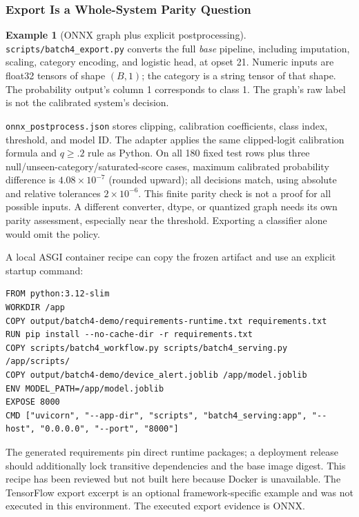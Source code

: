\documentclass[11pt,twoside]{article}
\numberwithin{equation}{section}
\theoremstyle{plain}
\theoremstyle{definition}
\newtheorem{example}[theorem]{Example}
\theoremstyle{remark}
\begin{document}
\subsubsection{Export Is a Whole-System Parity Question}
\begin{example}[ONNX graph plus explicit postprocessing]
\texttt{scripts/batch4\_export.py} converts the full \emph{base} pipeline,
including imputation, scaling, category encoding, and logistic head, at opset 21.
Numeric inputs are float32 tensors of shape $(B,1)$; the category is a string
tensor of that shape. The probability output's column 1 corresponds to class 1.
The graph's raw label is not the calibrated system's decision.

\texttt{onnx\_postprocess.json} stores clipping, calibration coefficients, class
index, threshold, and model ID. The adapter applies the same clipped-logit
calibration formula and $q\ge .2$ rule as Python. On all 180 fixed test rows
plus three null/unseen-category/saturated-score cases, maximum calibrated
probability difference is $4.08\times10^{-7}$ (rounded upward); all decisions
match, using absolute and relative tolerances $2\times10^{-6}$.
This finite parity check is not a proof for all possible inputs. A different
converter, dtype, or quantized graph needs its own parity assessment, especially
near the threshold. Exporting a classifier alone would omit the policy.
\end{example}

A local ASGI container recipe can copy the frozen artifact and use an explicit
startup command:
\begin{lstlisting}[basicstyle=\ttfamily\footnotesize]
FROM python:3.12-slim
WORKDIR /app
COPY output/batch4-demo/requirements-runtime.txt requirements.txt
RUN pip install --no-cache-dir -r requirements.txt
COPY scripts/batch4_workflow.py scripts/batch4_serving.py /app/scripts/
COPY output/batch4-demo/device_alert.joblib /app/model.joblib
ENV MODEL_PATH=/app/model.joblib
EXPOSE 8000
CMD ["uvicorn", "--app-dir", "scripts", "batch4_serving:app", "--host", "0.0.0.0", "--port", "8000"]
\end{lstlisting}
The generated requirements pin direct runtime packages; a deployment release
should additionally lock transitive dependencies and the base image digest.
This recipe has been reviewed but not built here because Docker is unavailable.
The TensorFlow export excerpt is an optional framework-specific example and
was not executed in this environment. The executed export evidence is ONNX.
\end{document}
